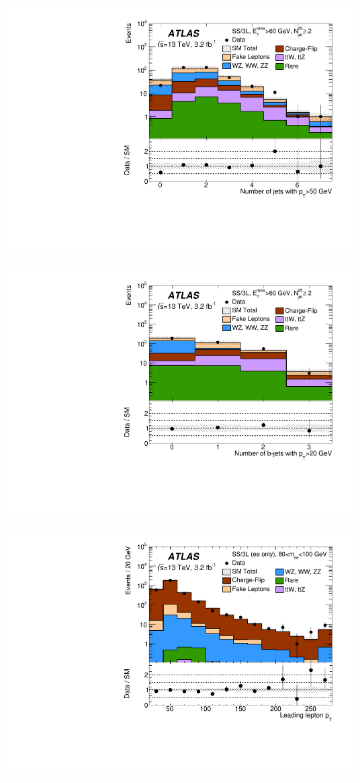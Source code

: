 		
\begin{figure}[p!]
\centering
\begin{subfigure}[t]{0.46\textwidth}\includegraphics[width=\textwidth]{FIGURES/CONF_LEP_LEP_NJETS50.pdf}
\caption{}\label{fig:VRa}\end{subfigure}
\begin{subfigure}[t]{0.46\textwidth}\includegraphics[width=\textwidth]{FIGURES/CONF_LEP_NBJETS20.pdf}
\caption{}\label{fig:VRb}\end{subfigure}
\begin{subfigure}[t]{0.46\textwidth}\includegraphics[width=\textwidth]{FIGURES/CONF_EE_ZcutBveto_PTLEAD.pdf}

\end{subfigure}
\end{figure}
